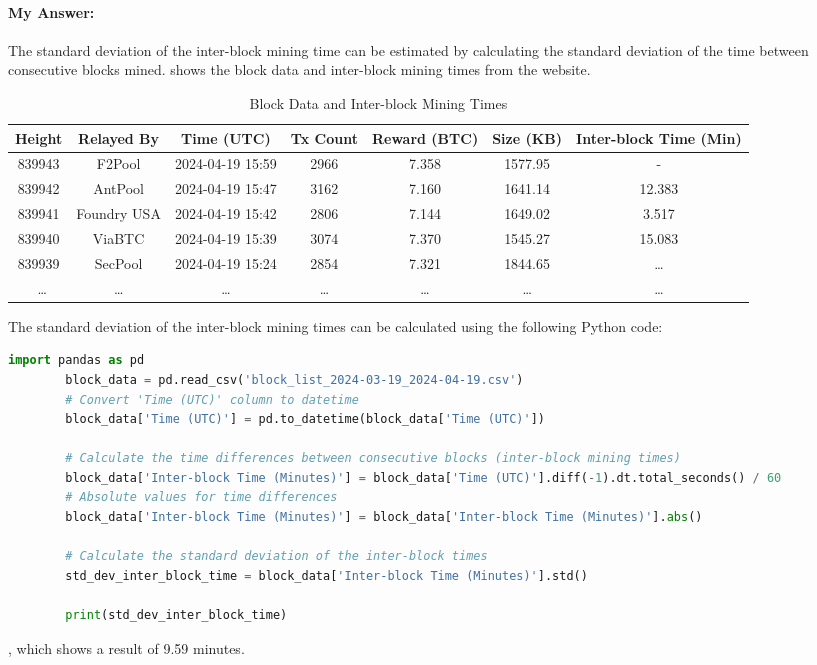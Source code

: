 \documentclass{article}
\begin{document}
\begin{enumerate}[label=(\alph*)]
    \paragraph{My Answer:} The standard deviation of the inter-block mining time can be estimated by calculating the standard deviation of the time between consecutive blocks mined.  shows the block data and inter-block mining times from the website.
    
    \begin{table}[h!]
        \centering
        \tiny
        \begin{tabular}{ccccccc}
            \toprule
            \textbf{Height} & \textbf{Relayed By} & \textbf{Time (UTC)} & \textbf{Tx Count} & \textbf{Reward (BTC)} & \textbf{Size (KB)} & \textbf{Inter-block Time (Min)} \\
            \midrule
            839943 & F2Pool & 2024-04-19 15:59 & 2966 & 7.358 & 1577.95 & - \\
            839942 & AntPool & 2024-04-19 15:47 & 3162 & 7.160 & 1641.14 & 12.383 \\
            839941 & Foundry USA & 2024-04-19 15:42 & 2806 & 7.144 & 1649.02 & 3.517 \\
            839940 & ViaBTC & 2024-04-19 15:39 & 3074 & 7.370 & 1545.27 & 15.083 \\
            839939 & SecPool & 2024-04-19 15:24 & 2854 & 7.321 & 1844.65 & \ldots \\\
            \ldots & \ldots & \ldots & \ldots & \ldots & \ldots & \ldots \\
            \bottomrule
        \end{tabular}
        \caption{Block Data and Inter-block Mining Times}\label{tab:block_data}
    \end{table}

    The standard deviation of the inter-block mining times can be calculated using the following Python code:

    \begin{lstlisting}[language=Python, gobble=8]
        import pandas as pd
        block_data = pd.read_csv('block_list_2024-03-19_2024-04-19.csv')
        # Convert 'Time (UTC)' column to datetime
        block_data['Time (UTC)'] = pd.to_datetime(block_data['Time (UTC)'])
        
        # Calculate the time differences between consecutive blocks (inter-block mining times)
        block_data['Inter-block Time (Minutes)'] = block_data['Time (UTC)'].diff(-1).dt.total_seconds() / 60
        # Absolute values for time differences
        block_data['Inter-block Time (Minutes)'] = block_data['Inter-block Time (Minutes)'].abs()
        
        # Calculate the standard deviation of the inter-block times
        std_dev_inter_block_time = block_data['Inter-block Time (Minutes)'].std()
        
        print(std_dev_inter_block_time)        
    \end{lstlisting}
    , which shows a result of 9.59 minutes.
    
\end{enumerate}
\end{document}
